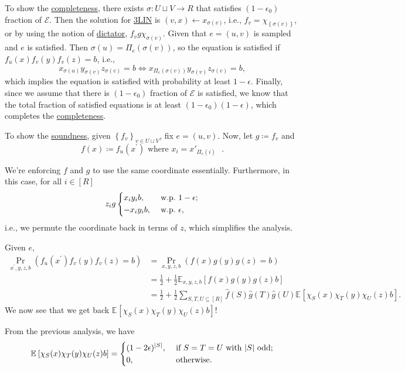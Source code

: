 To show the \hyperref[def:completeness]{completeness}, there exists \(\sigma \colon U \sqcup V \to R\) that satisfies \((1 - \epsilon _0)\) fraction of \(\mathcal{E} \). Then the solution for \hyperref[prb:max-3LIN]{3LIN} is \((v, x) \gets x_{\sigma (v)}\), i.e., \(f_v = \chi _{\left\{ \sigma (v) \right\} }\), or by using the notion of \hyperref[def:dictation]{dictator}, \(f_v g \chi _{\sigma (v)}\). Given that \(e=(u, v)\) is sampled and \(e\) is satisfied. Then \(\sigma (u) = \Pi _e(\sigma (v))\), so the equation is satisfied if \(f_u(x) f_v(y) f_v(z) = b\), i.e.,
\[
	x_{\sigma (u)} y_{\sigma (v)} z_{\sigma (v)} = b
	\iff x_{\Pi_e (\sigma (v))} y_{\sigma (v)} z_{\sigma (v)} = b,
\]
which implies the equation is satisfied with probability at least \(1 - \epsilon\). Finally, since we assume that there is \((1-\epsilon _0)\) fraction of \(\mathcal{E} \) is satisfied, we know that the total fraction of satisfied equations is at least \((1-\epsilon _0) (1-\epsilon )\), which completes the \hyperref[def:completeness]{completeness}.

To show the \hyperref[def:soundness]{soundness}, given \(\left\{ f_v \right\} _{v\in U \sqcup V}\), fix \(e=(u, v)\). Now, let \(g\coloneqq f_v\) and
\[
	f(x) \coloneqq f_u(x^\prime ) \text{ where \(x_i = x'_{\Pi_e(i)}\) }.
\]
\begin{note}
	We're enforcing \(f\) and \(g\) to use the same coordinate essentially. Furthermore, in this case, for all \(i\in [R]\)
	\[
		z_i g \begin{dcases}
			x_i y_i b,  & \text{ w.p.\ } 1-\epsilon  ; \\
			-x_i y_i b, & \text{ w.p.\ } \epsilon  ,
		\end{dcases}
	\]
	i.e., we permute the coordinate back in terms of \(z\), which simplifies the analysis.
\end{note}

Given \(e\),
\[
	\begin{split}
		\Pr_{x^\prime , y, z, b}(f_u(x^\prime ) f_v(y) f_v(z) = b)
		&= \Pr_{x , y, z, b}(f(x) g(y) g(z) = b)\\
		&= \frac{1}{2} + \frac{1}{2} \mathbb{E}_{x, y, z, b}\left[f(x) g(y) g(z) b \right]\\
		&= \frac{1}{2} + \frac{1}{2} \sum_{S, T, U \subseteq [R]} \hat{f} (S) \hat{g} (T) \hat{g} (U) \mathbb{E}_{}\left[\chi _S(x) \chi _T (y) \chi _U(z) b \right].
	\end{split}
\]
We now see that we get back \(\mathbb{E}_{}\left[\chi _S(x) \chi _T (y) \chi _U(z) b \right]\)!
\begin{prev}
	From the previous analysis, we have
	\[
		\mathbb{E}_{}\left[\chi _S(x) \chi _T (y) \chi _U(z) b \right]
		= \begin{dcases}
			(1-2\epsilon )^{\vert S \vert }, & \text{ if } S=T=U \text{ with \(\vert S \vert \) odd}  ; \\
			0,                               & \text{ otherwise}  .
		\end{dcases}
	\]
\end{prev}

